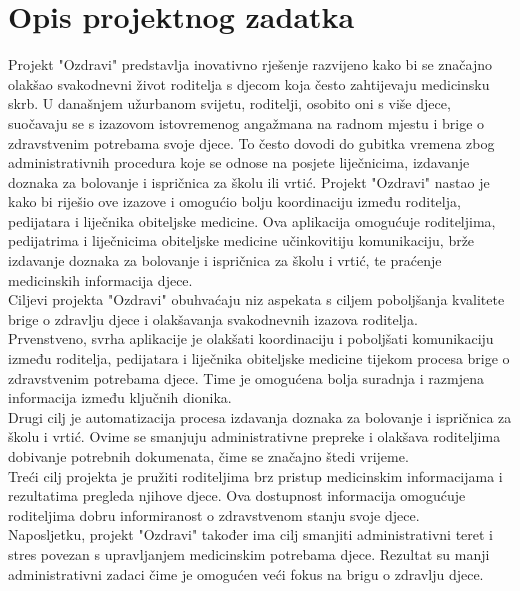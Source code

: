 \chapter{Opis projektnog zadatka}  


    Projekt "Ozdravi" predstavlja inovativno rješenje razvijeno kako bi se značajno olakšao svakodnevni život roditelja s djecom koja često zahtijevaju medicinsku skrb. U današnjem užurbanom svijetu, roditelji, osobito oni s više djece, suočavaju se s izazovom istovremenog angažmana na radnom mjestu i brige o zdravstvenim potrebama svoje djece. To često dovodi do gubitka vremena zbog administrativnih procedura koje se odnose na posjete liječnicima, izdavanje doznaka za bolovanje i ispričnica za školu ili vrtić. Projekt "Ozdravi" nastao je kako bi riješio ove izazove i omogućio bolju koordinaciju između roditelja, pedijatara i liječnika obiteljske medicine. 
    Ova aplikacija omogućuje roditeljima, pedijatrima i liječnicima obiteljske medicine učinkovitiju komunikaciju, brže izdavanje doznaka za bolovanje i ispričnica za školu i vrtić, te praćenje medicinskih informacija djece.
\\

Ciljevi projekta "Ozdravi" obuhvaćaju niz aspekata s ciljem poboljšanja kvalitete brige o zdravlju djece i olakšavanja svakodnevnih izazova roditelja. \\

Prvenstveno, svrha aplikacije je olakšati koordinaciju i poboljšati komunikaciju između roditelja, pedijatara i liječnika obiteljske medicine tijekom procesa brige o zdravstvenim potrebama djece. Time je omogućena bolja suradnja i razmjena informacija između ključnih dionika. \\

Drugi cilj je automatizacija procesa izdavanja doznaka za bolovanje i ispričnica za školu i vrtić. Ovime se smanjuju administrativne prepreke i olakšava roditeljima dobivanje potrebnih dokumenata, čime se značajno štedi vrijeme.
\\

Treći cilj projekta je pružiti roditeljima brz pristup medicinskim informacijama i rezultatima pregleda njihove djece. Ova dostupnost informacija omogućuje roditeljima dobru informiranost o zdravstvenom stanju svoje djece.
\\
Naposljetku, projekt "Ozdravi" također ima cilj smanjiti administrativni teret i stres povezan s upravljanjem medicinskim potrebama djece. Rezultat su manji administrativni zadaci čime je omogućen veći fokus na brigu o zdravlju djece. \\

